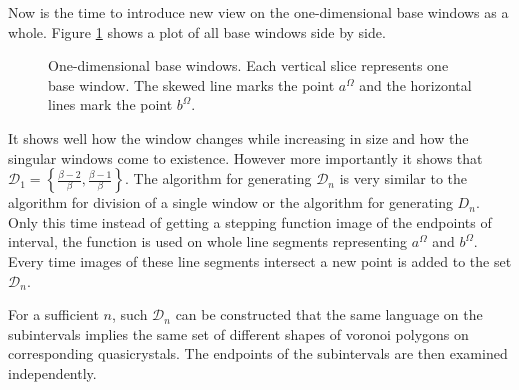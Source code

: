 \documentclass[text.tex]{subfiles}
\begin{document}
Now is the time to introduce new view on the one-dimensional base windows as a whole. Figure \ref{fig:allBaseWindows} shows a plot of all base windows side by side.

\begin{figure}[h]
\centering
{}
\caption{One-dimensional base windows. Each vertical slice represents one base window. The skewed line marks the point $a^\Omega$ and the horizontal lines mark the point $b^\Omega$.}
\label{fig:allBaseWindows}
\end{figure}

It shows well how the window changes while increasing in size and how the singular windows come to existence. However more importantly it shows that $\mathcal{D}_1 = \left\{\frac{\beta-2}{\beta}, \frac{\beta-1}{\beta}\right\}$.
The algorithm for generating $\mathcal{D}_n$ is very similar to the algorithm for division of a single window or the algorithm for generating $D_n$. Only this time instead of getting a stepping function image of the endpoints of interval, the function is used on whole line segments representing $a^\Omega$ and $b^\Omega$. Every time images of these line segments intersect a new point is added to the set $\mathcal{D}_n$.

For a sufficient $n$, such $\mathcal{D}_n$ can be constructed that the same language on the subintervals implies the same set of different shapes of voronoi polygons on corresponding quasicrystals. The endpoints of the subintervals are then examined independently. 
\end{document}
